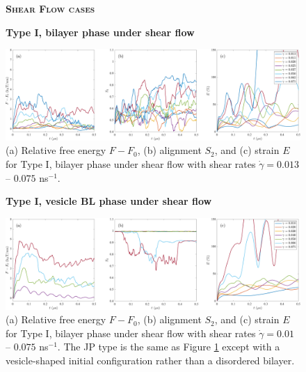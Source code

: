 \begin{figure}[h!]
\begin{center}
\textbf{\textsc{Shear Flow cases}}\par\medskip
\textbf{Type I, bilayer phase under shear flow}\par\medskip
\includegraphics[width=\textwidth]{SMFigures/ULShRaw.pdf}
\end{center}
\caption{(a) Relative free energy $F - F_0$, (b) alignment $S_2$, and
  (c) strain $E$ for Type I, bilayer phase under shear flow with shear
  rates $\dot\gamma=0.013$ -- $0.075$ ns$^{-1}$.
}
\label{fig:ulshraw}
\end{figure}


\begin{figure}[h!]
\begin{center}
\textbf{Type I, vesicle BL phase under shear flow}\par\medskip
\includegraphics[width=\textwidth]{SMFigures/VeShRaw.pdf}
\end{center}
\caption{(a) Relative free energy $F - F_0$, (b) alignment $S_2$, and
  (c) strain $E$ for Type I, bilayer phase under shear flow with shear
  rates $\dot\gamma=0.01$ -- $0.075$ ns$^{-1}$.  The JP type is the same
  as Figure \ref{fig:ulshraw} except with a vesicle-shaped initial
  configuration rather than a
  disordered bilayer.  
}
\label{fig:veshraw}
\end{figure}


